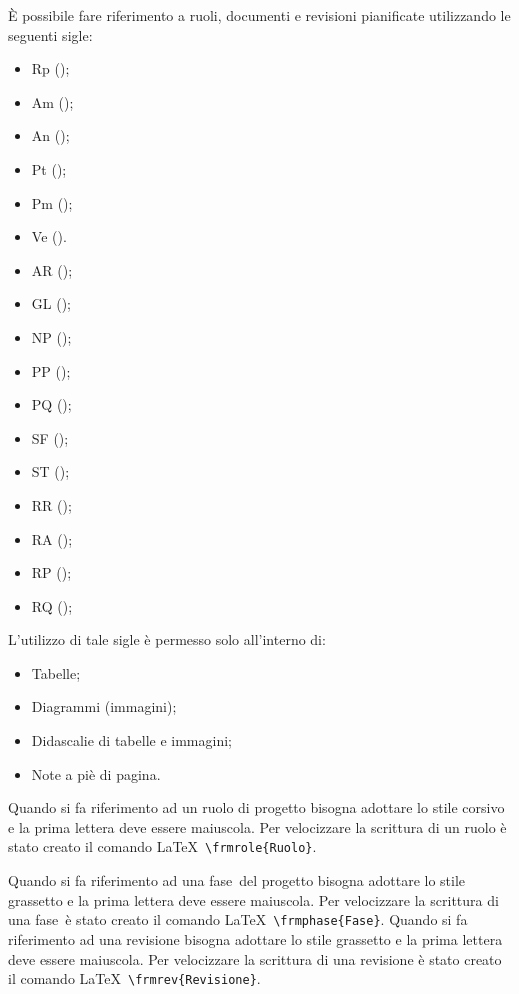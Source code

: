 \documentclass[../NormeProgetto.tex]{subfiles}
\begin{document}
			È possibile fare riferimento a ruoli, documenti e revisioni pianificate utilizzando le seguenti sigle:
			\begin{itemize}
				\item Rp (\responsabilediprogetto);
				\item Am (\amministratore);
				\item An (\analista);
				\item Pt (\progettista);
				\item Pm (\programmatore);
				\item Ve (\verificatore).
				
				\item AR (\analisideirequisiti);
				\item GL (\glossario);
				\item NP (\normediprogetto);
				\item PP (\pianodiprogetto);
				\item PQ (\pianodiqualifica);
				\item SF (\studiodifattibilita);
				\item ST (\specificatecnica);
				
				\item RR (\revisionedeirequisiti);
				\item RA (\revisionediaccettazione);
				\item RP (\revisionediprogettazione);
				\item RQ (\revisionediqualifica);
			\end{itemize}
			L'utilizzo di tale sigle è permesso solo all'interno di:
			\begin{itemize}
				\item Tabelle;
				\item Diagrammi (immagini);
				\item Didascalie di tabelle e immagini;
				\item Note a piè di pagina.
			\end{itemize}
			Quando si fa riferimento ad un ruolo di progetto bisogna adottare lo stile corsivo e la prima lettera deve essere maiuscola. 	 Per velocizzare la scrittura di un ruolo è stato creato il comando \LaTeX\ \texttt{\textbackslash frmrole\{Ruolo\}}. 
			
			Quando si fa riferimento ad una fase\g\ del progetto bisogna adottare lo stile grassetto e la prima lettera deve essere maiuscola.	 Per velocizzare la scrittura di una fase\g\ è stato creato il comando \LaTeX\ \texttt{\textbackslash frmphase\{Fase\}}. 
			Quando si fa riferimento ad una revisione bisogna adottare lo stile grassetto e la prima lettera deve essere maiuscola. Per velocizzare la scrittura di una revisione è stato creato il comando \LaTeX\ \texttt{\textbackslash frmrev\{Revisione\}}.
			
\end{document}
